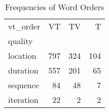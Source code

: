 \begin{table}[htbp!]
\centering
\caption{Frequencies of Word Orders}
\label{table:order_ct}
\begin{tabular}{lrrr}
\toprule
vt\_order &   VT &   TV &    T \\
quality   &      &      &      \\
\midrule
location  &  797 &  324 &  104 \\
duration  &  557 &  201 &   65 \\
sequence  &   84 &   48 &    7 \\
iteration &   22 &    2 &    2 \\
\bottomrule
\end{tabular}
\end{table}
